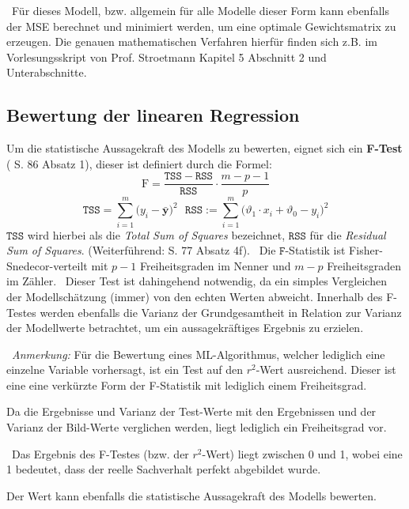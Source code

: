 ~\newline Für dieses Modell, bzw. allgemein für alle Modelle dieser Form kann ebenfalls der MSE berechnet und minimiert werden, um eine optimale Gewichtsmatrix zu erzeugen. Die genauen mathematischen Verfahren hierfür finden sich z.B. im Vorlesungsskript von Prof. Stroetmann \cite{stroetmann} Kapitel 5 Abschnitt 2 und Unterabschnitte.
\subsection{Bewertung der linearen Regression}
\label{subsec:LinRegAcc}
Um die statistische Aussagekraft des Modells zu bewerten, eignet sich ein \textbf{F-Test} (\cite{stroetmann} S. 86 Absatz 1), dieser ist definiert durch die Formel:
\begin{equation}
\label{eq:F-statistic}
\mathrm{F} = \frac{\mathtt{TSS} - \mathtt{RSS}}{\mathtt{RSS}} \cdot \frac{m - p - 1}{p}
\end{equation}
\begin{equation}
\mathtt{TSS} = \sum\limits_{i=1}^m \bigl(y_i - \bar{\mathbf{y}}\bigr)^2 \ \ \
\mathtt{RSS} := \sum\limits_{i=1}^m \bigl(\vartheta_1 \cdot x_i + \vartheta_0 - y_i\bigr)^2
\end{equation}
$\mathtt{TSS}$ wird hierbei als die \textit{Total Sum of Squares} bezeichnet, $\mathtt{RSS}$ für die \textit{Residual Sum of Squares}. (Weiterführend: \cite{stroetmann} S. 77 Absatz 4f). 
~\newline Die $\mathtt{F}$-Statistik ist Fisher-Snedecor-verteilt mit $p-1$ Freiheitsgraden im Nenner und $m-p$ Freiheitsgraden im Zähler. 
~\newline Dieser Test ist dahingehend notwendig, da ein simples Vergleichen der Modellschätzung (immer) von den echten Werten abweicht. Innerhalb des F-Testes werden ebenfalls die Varianz der Grundgesamtheit in Relation zur Varianz der Modellwerte betrachtet, um ein aussagekräftiges Ergebnis zu erzielen.


~\newline \textit{Anmerkung:} Für die Bewertung eines ML-Algorithmus, welcher lediglich eine einzelne Variable vorhersagt, ist ein Test auf den $r^2$-Wert ausreichend. Dieser ist eine eine verkürzte Form der F-Statistik mit lediglich einem Freiheitsgrad. 

Da die Ergebnisse und  Varianz der Test-Werte mit den Ergebnissen und der  Varianz der Bild-Werte verglichen werden, liegt lediglich ein Freiheitsgrad vor.  

~\newline Das Ergebnis des F-Testes (bzw. der $r^2$-Wert) liegt zwischen 0 und 1, wobei eine 1 bedeutet, dass der reelle Sachverhalt perfekt abgebildet wurde. 

Der Wert kann ebenfalls die statistische Aussagekraft des Modells bewerten.